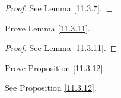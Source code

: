 \begin{proof}
    See Lemma \ref{11.3.7}.
\end{proof}

\begin{exercise}\label{ex 11.3.4}
    Prove Lemma \ref{11.3.11}.
\end{exercise}

\begin{proof}
    See Lemma \ref{11.3.11}.
\end{proof}

\begin{exercise}\label{ex 11.3.5}
    Prove Proposition \ref{11.3.12}.
\end{exercise}

\begin{proposition}
    See Proposition \ref{11.3.12}.
\end{proposition}